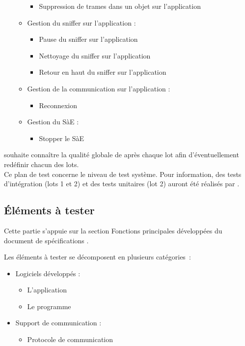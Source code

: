 \begin{itemize}
\begin{itemize}
\begin{itemize}
            \item Suppression de trames dans un objet sur l'application {\appliA}
        \end{itemize}
        \item Gestion du sniffer sur l'application {\appliA} :
        \begin{itemize}
            \item Pause du sniffer sur l'application {\appliA}
            \item Nettoyage du sniffer sur l'application {\appliA}
            \item Retour en haut du sniffer sur l'application {\appliA}
        \end{itemize}
        \item Gestion de la communication sur l'application {\appliA} :
        \begin{itemize}
            \item Reconnexion
        \end{itemize}
        \item Gestion du SàE :
        \begin{itemize}
            \item Stopper le SàE
        \end{itemize}
    \end{itemize}
\end{itemize}
\medskip

{\client} souhaite connaître la qualité globale de \og {\produit} \fg après chaque lot afin d'éventuellement redéfinir chacun des lots. \\
Ce plan de test concerne le niveau de test système. Pour information, des tests d'intégration (lots 1 et 2) et des tests unitaires (lot 2) auront été réalisés par {\equipe}.

\subsection{Éléments à tester}
\label{sec:peri:elements} 

Cette partie s'appuie sur la section  Fonctions principales développées \fg du document de spécifications {}. 
\medskip

Les éléments à tester se décomposent en plusieurs catégories~:
\begin{itemize}
    \item Logiciels développés :
    \begin{itemize}
        \item L'application {\appliA}
        \item Le programme {\appliC}
    \end{itemize}
    \item Support de communication :
    \begin{itemize}
        \item Protocole de communication
    \end{itemize}
\end{itemize}

